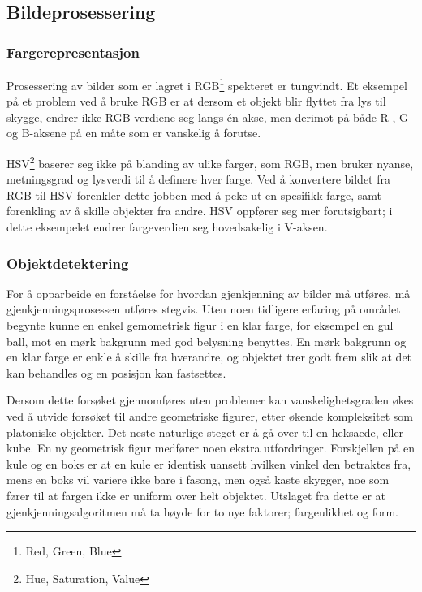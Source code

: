 \subsection{Bildeprosessering}

\subsubsection{Fargerepresentasjon}
Prosessering av bilder som er lagret i RGB\footnote{Red, Green, Blue} spekteret er tungvindt. Et eksempel på et problem ved å bruke RGB er at dersom et objekt blir flyttet fra lys til skygge, endrer ikke RGB-verdiene seg langs én akse, men derimot på både R-, G- og B-aksene på en måte som er vanskelig å forutse.

HSV\footnote{Hue, Saturation, Value} baserer seg ikke på blanding av ulike farger, som RGB, men bruker nyanse, metningsgrad og lysverdi til å definere hver farge. Ved å konvertere bildet fra RGB til HSV forenkler dette jobben med å peke ut en spesifikk farge, samt forenkling av å skille objekter fra andre. HSV oppfører seg mer forutsigbart; i dette eksempelet endrer fargeverdien seg hovedsakelig i V-aksen. 

\subsubsection{Objektdetektering}
For å opparbeide en forståelse for hvordan gjenkjenning av bilder må utføres, må gjenkjenningsprosessen utføres stegvis. Uten noen tidligere erfaring på området begynte kunne en enkel gemometrisk figur i en klar farge, for eksempel en gul ball, mot en mørk bakgrunn med god belysning benyttes. En mørk bakgrunn og en klar farge er enkle å skille fra hverandre, og objektet trer godt frem slik at det kan behandles og en posisjon kan fastsettes.

Dersom dette forsøket gjennomføres uten problemer kan vanskelighetsgraden økes ved å utvide forsøket til andre geometriske figurer, etter økende kompleksitet som platoniske objekter. Det neste naturlige steget er å gå over til en heksaede, eller kube. En ny geometrisk figur medfører noen ekstra utfordringer. Forskjellen på en kule og en boks er at en kule er identisk uansett hvilken vinkel den betraktes fra, mens en boks vil variere ikke bare i fasong, men også kaste skygger, noe som fører til at fargen ikke er uniform over helt objektet. Utslaget fra dette er at gjenkjenningsalgoritmen må ta høyde for to nye faktorer; fargeulikhet og form. 

